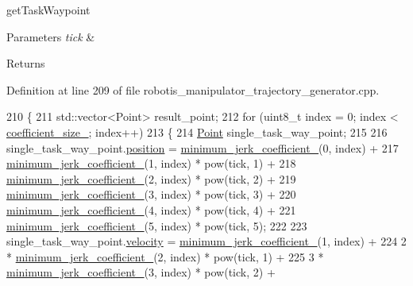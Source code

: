 get\+Task\+Waypoint 


\begin{DoxyParams}{Parameters}
{\em tick} & \\
\hline
\end{DoxyParams}
\begin{DoxyReturn}{Returns}

\end{DoxyReturn}


Definition at line 209 of file robotis\+\_\+manipulator\+\_\+trajectory\+\_\+generator.\+cpp.


\begin{DoxyCode}
210 \{
211   std::vector<Point> result\_point;
212   \textcolor{keywordflow}{for} (uint8\_t index = 0; index < \hyperlink{classrobotis__manipulator_1_1_task_trajectory_a3e18bd8e5e8b327d15afd8831ba099f5}{coefficient\_size\_}; index++)
213   \{
214     \hyperlink{structrobotis__manipulator_1_1_point}{Point} single\_task\_way\_point;
215 
216     single\_task\_way\_point.\hyperlink{structrobotis__manipulator_1_1_point_a0f122386b502d9b316bdead542ed2145}{position} = \hyperlink{classrobotis__manipulator_1_1_task_trajectory_a19c6e0525c29db0b3bad7950baa74e42}{minimum\_jerk\_coefficient\_}(0, index) +
217              \hyperlink{classrobotis__manipulator_1_1_task_trajectory_a19c6e0525c29db0b3bad7950baa74e42}{minimum\_jerk\_coefficient\_}(1, index) * pow(tick, 1) +
218              \hyperlink{classrobotis__manipulator_1_1_task_trajectory_a19c6e0525c29db0b3bad7950baa74e42}{minimum\_jerk\_coefficient\_}(2, index) * pow(tick, 2) +
219              \hyperlink{classrobotis__manipulator_1_1_task_trajectory_a19c6e0525c29db0b3bad7950baa74e42}{minimum\_jerk\_coefficient\_}(3, index) * pow(tick, 3) +
220              \hyperlink{classrobotis__manipulator_1_1_task_trajectory_a19c6e0525c29db0b3bad7950baa74e42}{minimum\_jerk\_coefficient\_}(4, index) * pow(tick, 4) +
221              \hyperlink{classrobotis__manipulator_1_1_task_trajectory_a19c6e0525c29db0b3bad7950baa74e42}{minimum\_jerk\_coefficient\_}(5, index) * pow(tick, 5);
222 
223     single\_task\_way\_point.\hyperlink{structrobotis__manipulator_1_1_point_a4eaec95fac0c755eb0aa704b36ebe97b}{velocity} = \hyperlink{classrobotis__manipulator_1_1_task_trajectory_a19c6e0525c29db0b3bad7950baa74e42}{minimum\_jerk\_coefficient\_}(1, index) +
224              2 * \hyperlink{classrobotis__manipulator_1_1_task_trajectory_a19c6e0525c29db0b3bad7950baa74e42}{minimum\_jerk\_coefficient\_}(2, index) * pow(tick, 1) +
225              3 * \hyperlink{classrobotis__manipulator_1_1_task_trajectory_a19c6e0525c29db0b3bad7950baa74e42}{minimum\_jerk\_coefficient\_}(3, index) * pow(tick, 2) +

\end{DoxyCode}
